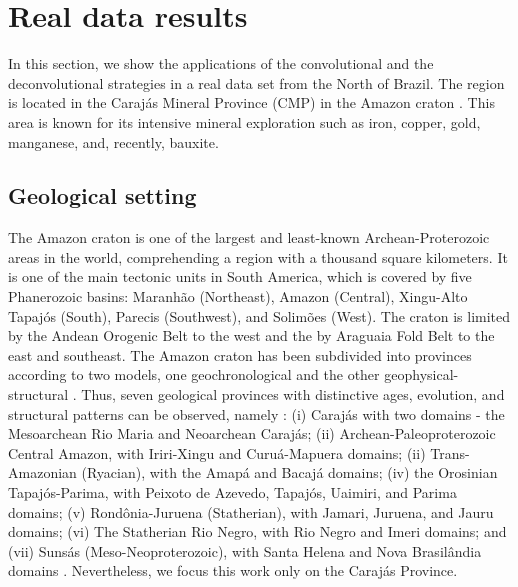 \section{Real data results}
\label{sec:real_data}

In this section, we show the applications of the convolutional and the deconvolutional strategies in a real data set from the North of Brazil. The region is located in the Carajás Mineral Province (CMP) in the Amazon craton \citep{moroni-etal2001,villas-santos2001}. This area is known for its intensive mineral exploration such as iron, copper, gold, manganese, and, recently, bauxite.

\subsection{Geological setting}

The Amazon craton is one of the largest and least-known Archean-Proterozoic areas in the world, comprehending a region with a thousand square kilometers. It is one of the main tectonic units in South America, which is covered by five Phanerozoic basins: Maranhão (Northeast), Amazon (Central), Xingu-Alto Tapajós (South), Parecis (Southwest), and Solimões (West). The craton is limited by the Andean Orogenic Belt to the west and the by Araguaia Fold Belt to the east and southeast. The Amazon craton has been subdivided into provinces according to two models, one geochronological and the other geophysical-structural \citep{amaral1974, teixeira-etal1989, tassinari-macambira1999}. Thus, seven geological provinces with distinctive ages, evolution, and structural patterns can be observed, namely : (i) Carajás with two domains - the Mesoarchean Rio Maria and Neoarchean Carajás; (ii) Archean-Paleoproterozoic Central Amazon, with Iriri-Xingu and Curuá-Mapuera domains; (ii) Trans-Amazonian (Ryacian), with the Amapá and Bacajá domains; (iv) the Orosinian Tapajós-Parima, with Peixoto de Azevedo, Tapajós, Uaimiri, and Parima domains; (v) Rondônia-Juruena (Statherian), with Jamari, Juruena, and Jauru domains; (vi) The Statherian Rio Negro, with Rio Negro and Imeri domains; and (vii) Sunsás (Meso-Neoproterozoic), with Santa Helena and Nova Brasilândia domains \citep{santos-etal2000}. Nevertheless, we focus this work only on the Carajás Province. 


